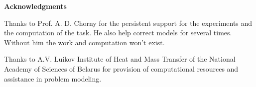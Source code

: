 \begin{center}
	\Large\textbf{Acknowledgments}
\end{center}

Thanks to Prof. A. D. Chorny for the persistent support for the experiments and the computation of the task. He also help correct models for several times. Without him the work and computation won’t exist.

Thanks to A.V. Luikov Institute of Heat and Mass Transfer of the National Academy of Sciences of Belarus for provision of computational resources and assistance in problem modeling.